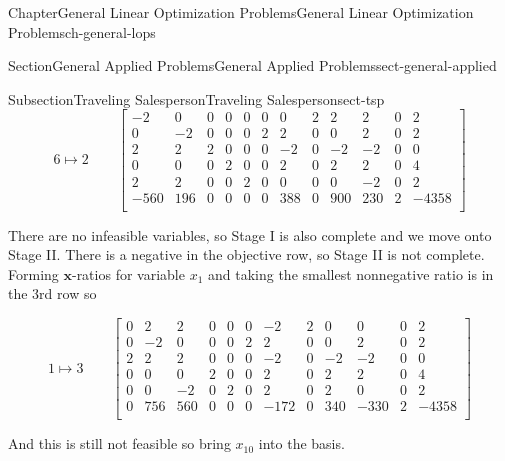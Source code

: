 \documentclass[oneside,10pt,]{book}
\numberwithin{equation}{section}
\newcommand{\amp}{&}
\begin{document}
\begin{chapterptx}{Chapter}{General Linear Optimization Problems}{}{General Linear Optimization Problems}{}{}{ch-general-lops}
\begin{sectionptx}{Section}{General Applied Problems}{}{General Applied Problems}{}{}{sect-general-applied}
\begin{subsectionptx}{Subsection}{Traveling Salesperson}{}{Traveling Salesperson}{}{}{sect-tsp}
\begin{equation*}
6 \mapsto 2 \qquad \left[\begin{array}{rrrrr|rrrrrr|r} -2 \amp 0 \amp 0 \amp 0 \amp 0 \amp 0 \amp 0 \amp 2 \amp 2 \amp 2 \amp 0 \amp 2\\ 0 \amp -2 \amp 0 \amp 0 \amp 0 \amp 2 \amp 2 \amp 0 \amp 0 \amp 2 \amp 0 \amp 2\\ 2 \amp 2 \amp 2 \amp 0 \amp 0 \amp 0 \amp -2 \amp 0 \amp -2 \amp -2 \amp 0 \amp 0\\ 0 \amp 0 \amp 0 \amp 2 \amp 0 \amp 0 \amp 2 \amp 0 \amp 2 \amp 2 \amp 0 \amp 4\\ 2 \amp 2 \amp 0 \amp 0 \amp 2 \amp 0 \amp 0 \amp 0 \amp 0 \amp -2 \amp 0 \amp 2\\ \hline -560 \amp 196 \amp 0 \amp 0 \amp 0 \amp 0 \amp 388 \amp 0 \amp 900 \amp 230 \amp 2 \amp -4358\\ \end{array} \right]
\end{equation*}
%
\par
There are no infeasible variables, so Stage I is also complete and we move onto Stage II. There is a negative in the objective row, so Stage II is not complete. Forming \(\boldsymbol{x}\)-ratios for variable \(x_1\) and taking the smallest nonnegative ratio is in the 3rd row so%
\par
%
\begin{equation*}
1 \mapsto 3 \qquad \left[\begin{array}{rrrrr|rrrrrr|r} 0 \amp 2 \amp 2 \amp 0 \amp 0 \amp 0 \amp -2 \amp 2 \amp 0 \amp 0 \amp 0 \amp 2\\ 0 \amp -2 \amp 0 \amp 0 \amp 0 \amp 2 \amp 2 \amp 0 \amp 0 \amp 2 \amp 0 \amp 2\\ 2 \amp 2 \amp 2 \amp 0 \amp 0 \amp 0 \amp -2 \amp 0 \amp -2 \amp -2 \amp 0 \amp 0\\ 0 \amp 0 \amp 0 \amp 2 \amp 0 \amp 0 \amp 2 \amp 0 \amp 2 \amp 2 \amp 0 \amp 4\\ 0 \amp 0 \amp -2 \amp 0 \amp 2 \amp 0 \amp 2 \amp 0 \amp 2 \amp 0 \amp 0 \amp 2\\ \hline 0 \amp 756 \amp 560 \amp 0 \amp 0 \amp 0 \amp -172 \amp 0 \amp 340 \amp -330 \amp 2 \amp -4358\\ \end{array} \right]
\end{equation*}
%
\par
And this is still not feasible so bring \(x_{10}\) into the basis.%
\par
%
\begin{equation*}

\end{equation*}
\end{subsectionptx}
\end{sectionptx}
\end{chapterptx}
\end{document}
